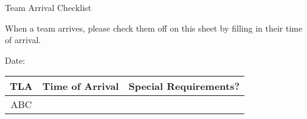 \documentclass[a4paper, 12pt]{article}
\begin{document}
\begin{center}

    {\huge{Team Arrival Checklist}}

    \medskip

\end{center}

When a team arrives, please check them off on this sheet by filling in their time of arrival.
\bigskip

{\large{Date}: \hrulefill}

\large
\def\arraystretch{1.5}
\begin{tabularx}{\textwidth}{|c|c|c|}
    \textbf{TLA} & \textbf{Time of Arrival} & \textbf{Special Requirements?} \\
\hline
ABC & & \\ \hline
\end{tabularx}
\end{document}
